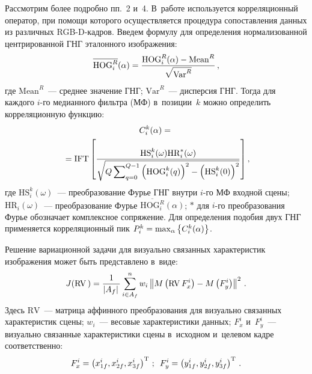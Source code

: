 \begin{multicols}{2}
  Рассмотрим более подробно пп.~2 и~4. В~работе используется 
корреляционный оператор, при помощи которого осуществляется процедура 
со\-по\-став\-ле\-ния данных из различных RGB-D-кад\-ров. Введем формулу для 
определения нормализованной центрированной ГНГ эталонного изображения:
  \begin{equation*}
  \overline{\mathrm{HOG}_i^R}(\alpha) =\displaystyle\frac{\displaystyle \mathrm{HOG}_i^R(\alpha) -
  \mathrm{Mean}^R\mathstrut}{\displaystyle \sqrt{\mathrm{Var}^R}\mathstrut}\,,
  \end{equation*}
где $\mathrm{Mean}^R$~--- среднее значение ГНГ; $\mathrm{Var}^R$~--- дисперсия ГНГ. Тогда 
для каж\-до\-го $i$-го медианного фильт\-ра (МФ) в~позиции~$k$ можно 
определить корреляционную функцию:
\begin{multline*}
C_i^k(\alpha) ={}\\
{}=\mathrm{IFT} \left[ \displaystyle\frac{\displaystyle \mathrm{HS}_i^k(\omega) \mathrm{HR}_i^*(\omega)\mathstrut}{\displaystyle \sqrt{Q 
\sum\nolimits_{q=0}^{Q-1}\left( \mathrm{HOG}_i^k(q)\right)^2- \left( 
\mathrm{HS}_i^k(0)\right)^2}\mathstrut}\right],\hspace*{-0.56015pt}
\end{multline*}
где $\mathrm{HS}_i^k(\omega)$~--- преобразование Фурье ГНГ внутри $i$-го МФ 
входной сцены; $\mathrm{HR}_i(\omega)$~--- преобразование Фурье 
$\overline{\mathrm{HOG}_i^R}(\alpha)$; $*$ для $i$-го преобразования Фурье обозначает 
комплексное сопряжение. Для определения подобия двух ГНГ применяется 
корреляционный пик $P_i^k\hm= \max\nolimits_\alpha \left\{ 
C_i^k(\alpha)\right\}$.
  
  Решение вариационной задачи для визуально связанных характеристик 
изоб\-ра\-же\-ния может быть пред\-став\-ле\-но в~виде:
  \begin{equation*}
  J(\mathrm{RV}\,)=\displaystyle\frac{\displaystyle 1\mathstrut}{\displaystyle \left\vert {A}_f \right\vert\mathstrut} 
  \sum\limits^n_{i\in A_f} {w}_i\left\| 
M\left(\mathrm{RV}\,F_x^i\right) - M\left(F_y^i\right)\right\|^2\,.
  \end{equation*}
Здесь $\mathrm{RV}$~--- матрица аффинного преобразования для визуально связанных 
характеристик сцены; ${w}_i$~--- весовые характеристики данных; 
$F_x^i$ и~$F_y^i$~--- визуально связанные характеристики сцены в~исходном и~целевом кадре соответственно:
\begin{equation*}
F_x^i=\left( x^i_{1f}, x^i_{2f}, x^i_{3f}\right)^{\mathrm{T}}\,;\enskip
F_y^i= \left( y^i_{1f}, y^i_{2f}, y^i_{3f}\right)^{\mathrm{T}}\,.
\end{equation*}
  

\end{multicols}
